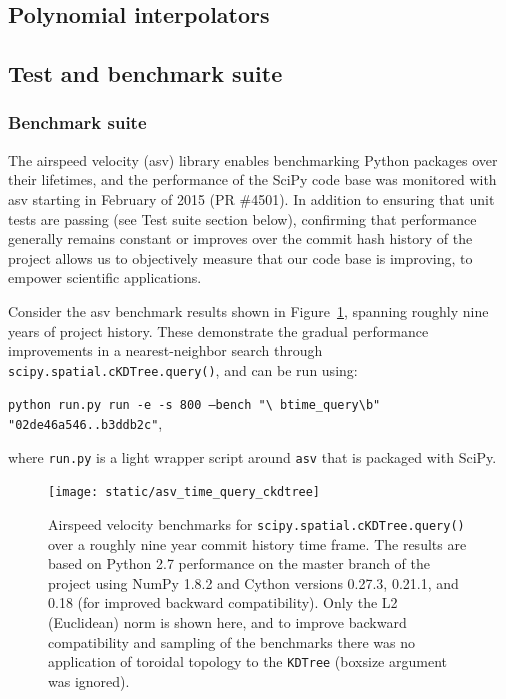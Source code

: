 \documentclass[fleqn,10pt]{wlscirep}
\begin{document}
\subsection*{Polynomial interpolators}



\subsection*{Test and benchmark suite}

\subsubsection*{Benchmark suite}

The airspeed velocity (asv\cite{asvref}) library enables benchmarking Python packages
over their lifetimes, and the performance of the SciPy code base was monitored
with asv starting in February of 2015 (PR \#4501). In addition to ensuring that
unit tests are passing (see Test suite section below), confirming 
that performance generally
remains constant or improves over the commit hash history of the project allows
us to objectively measure that our code base is improving, to empower
scientific applications.

Consider the asv benchmark results shown in Figure~\ref{fig:asvbench}, spanning
roughly nine years of project history. These demonstrate the gradual
performance improvements in a nearest-neighbor search through
\texttt{scipy.spatial.cKDTree.query()}, and can be run using:

\texttt{python run.py run -e -s 800 --bench "\textbackslash
btime\_query\textbackslash b" "02de46a546..b3ddb2c"},

where \texttt{run.py} is a light wrapper script around \texttt{asv}
that is packaged with SciPy.

\begin{figure}[H]
\centering
\texttt{[image: static/asv\_time\_query\_ckdtree]}
\caption{Airspeed velocity benchmarks for \texttt{scipy.spatial.cKDTree.query()}
over a roughly nine year commit history time frame. The results are based on
Python 2.7 performance on the master branch of the project using NumPy 1.8.2
and Cython versions 0.27.3, 0.21.1, and 0.18 (for improved backward
compatibility). Only the L2 (Euclidean) norm is shown here, and to improve
backward compatibility and sampling of the benchmarks there was no application
of toroidal topology to the \texttt{KDTree} (boxsize argument was ignored).}
\label{fig:asvbench}
\end{figure}
\end{document}
